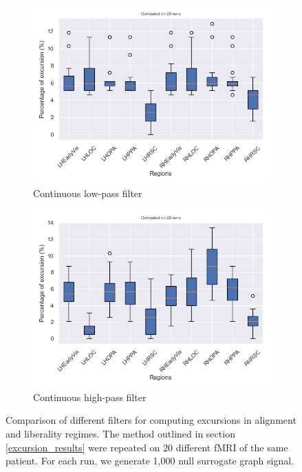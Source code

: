 \begin{figure}
\begin{subfigure}{0.45\textwidth}
        \centering
        \includegraphics[width=\textwidth]{img/low_continuous_filter_graph_randomization.png}
        \caption{Continuous low-pass filter}
    \end{subfigure}
    \hfill
    \begin{subfigure}{0.45\textwidth}
        \centering
        \includegraphics[width=\textwidth]{img/high_continuous_filter_graph_randomization.png}
        \caption{Continuous high-pass filter}
    \end{subfigure}
    \caption{Comparison of different filters for computing excursions in alignment and liberality regimes. The method outlined in section \ref{excursion_results} were repeated on $20$ different fMRI of the same patient. For each run, we generate 1,000 null surrogate graph signal.}
    \label{fig:result_excursions_filters}
\end{figure}


